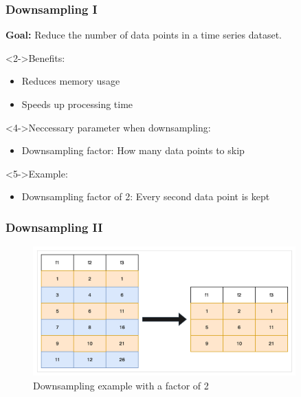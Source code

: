 \documentclass[t,english]{beamer}
\begin{document}
\begin{frame}
  \frametitle{Downsampling I}
  \textbf{Goal:} Reduce the number of data points in a time series dataset.

  \begin{block}<2->{Benefits:}
    \begin{itemize}
      \item<2-> Reduces memory usage
      \item<3-> Speeds up processing time
    \end{itemize}
  \end{block}

  \begin{block}<4->{Neccessary parameter when downsampling:}
    \begin{itemize}
      \item<4-> Downsampling factor: How many data points to skip
    \end{itemize}
  \end{block}

  \begin{block}<5->{Example:}
    \begin{itemize}
      \item<5-> Downsampling factor of 2: Every second data point is kept
    \end{itemize}
  \end{block}

\end{frame}

\begin{frame}
  \frametitle{Downsampling II}
  \begin{figure}[H]
    \includegraphics[width=0.9\textwidth]{figures/downsampling/downsampling.png}
    \caption{Downsampling example with a factor of 2}
    \label{fig:downsampling}
  \end{figure}

\end{frame}
\end{document}
